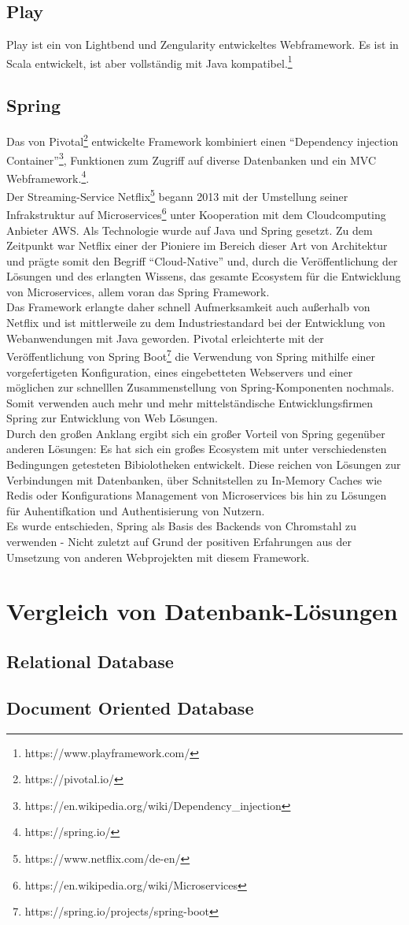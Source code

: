 \subsection{Play}
Play ist ein von Lightbend und Zengularity entwickeltes Webframework. Es ist in
Scala entwickelt, ist aber vollständig mit Java kompatibel.\footnote{https://www.playframework.com/}
\subsection{Spring}
Das von Pivotal\footnote{https://pivotal.io/} entwickelte Framework kombiniert einen ``Dependency injection
Container''\footnote{https://en.wikipedia.org/wiki/Dependency\_injection}, Funktionen zum Zugriff auf diverse Datenbanken und ein \ac{MVC}
Webframework.\footnote{https://spring.io/}.\\
Der Streaming-Service
Netflix\footnote{https://www.netflix.com/de-en/} begann 2013 mit der Umstellung
seiner Infrakstruktur auf Microservices\footnote{https://en.wikipedia.org/wiki/Microservices} unter Kooperation mit dem Cloudcomputing
Anbieter \ac{AWS}\cite{cloud-native-java}. Als Technologie wurde auf Java und
Spring gesetzt. Zu dem Zeitpunkt war Netflix einer
der Pioniere im Bereich dieser Art von Architektur und prägte somit den Begriff
``Cloud-Native'' und, durch die Veröffentlichung der Lösungen und des erlangten
Wissens, das gesamte Ecosystem für die Entwicklung von Microservices, allem
voran das Spring Framework.\\
Das Framework erlangte daher schnell Aufmerksamkeit auch außerhalb von Netflix
und ist mittlerweile zu dem Industriestandard bei der Entwicklung von
Webanwendungen mit Java geworden. Pivotal erleichterte mit der Veröffentlichung
von Spring Boot\footnote{https://spring.io/projects/spring-boot} die Verwendung
von Spring mithilfe einer vorgefertigeten Konfiguration, eines eingebetteten
Webservers und einer möglichen zur schnelllen Zusammenstellung von
Spring-Komponenten nochmals. Somit verwenden auch mehr und mehr mittelständische
Entwicklungsfirmen Spring zur Entwicklung von Web Lösungen.\\
Durch den großen Anklang ergibt sich ein großer Vorteil von Spring gegenüber
anderen Lösungen: Es hat sich ein großes Ecosystem mit unter verschiedensten
Bedingungen getesteten Bibiolotheken entwickelt. Diese reichen von Lösungen zur
Verbindungen mit Datenbanken, über Schnitstellen zu In-Memory Caches wie Redis
oder Konfigurations Management von Microservices bis hin zu Lösungen für
Auhentifkation und Authentisierung von Nutzern.\\
Es wurde entschieden, Spring als Basis des Backends von Chromstahl zu verwenden
- Nicht zuletzt auf Grund der positiven Erfahrungen aus der Umsetzung von
anderen Webprojekten mit diesem Framework.
\section{Vergleich von Datenbank-Lösungen}
\subsection{Relational Database}
\subsection{Document Oriented Database}